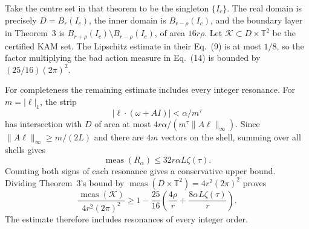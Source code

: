 Take the centre set in that theorem to be the singleton $\{I_c\}$.
The real domain is precisely $D=B_r(I_c)$, the inner domain is
$B_{r-\rho}(I_c)$, and the boundary layer in Theorem~3 is
$B_{r+\rho}(I_c)\setminus B_{r-\rho}(I_c)$, of area $16r\rho$.
Let $\mathcal K\subset D\times\mathbb T^2$ be the certified KAM set.
The Lipschitz estimate in their Eq.~(9) is at most $1/8$, so the
factor multiplying the bad action measure in Eq.~(14) is bounded
by $(25/16)(2\pi)^2$.

For completeness the remaining estimate includes every integer
resonance. For $m=|\ell|_1$, the strip
\[
 |\ell\cdot(\omega+AI)|<\alpha/m^\tau
\]
has intersection with $D$ of area at most
$4r\alpha/(m^\tau\|A\ell\|_\infty)$. Since
$\|A\ell\|_\infty\geq m/(2L)$ and there are $4m$ vectors on the
shell, summing over all shells gives
\[
 \operatorname{meas}(R_\alpha)\leq32r\alpha L\zeta(\tau).
\]
Counting both signs of each resonance gives a conservative upper
bound. Dividing Theorem~3's bound by
$\operatorname{meas}(D\times\mathbb T^2)=4r^2(2\pi)^2$ proves
\begin{equation}
 \frac{\operatorname{meas}(\mathcal K)}{4r^2(2\pi)^2}
 \geq1-\frac{25}{16}
 \left(\frac{4\rho}{r}+
       \frac{8\alpha L\zeta(\tau)}{r}\right).
 \label{eq:measure-ck-relative-lower-bound}
\end{equation}
The estimate therefore includes resonances of every integer order.

